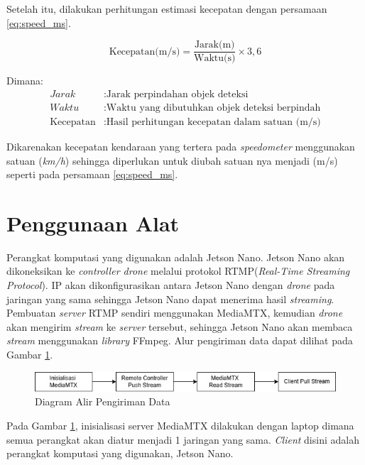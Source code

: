 Setelah itu, dilakukan perhitungan estimasi kecepatan dengan persamaan \ref{eq:speed_ms}.

\begin{equation}
  \label{eq:speed_ms}
  \text{Kecepatan(m/s)} = \frac{\text{Jarak(m)}}{\text{Waktu(s)}} \times 3{,}6
\end{equation}

\begin{flushleft}
Dimana:
\begin{align*}
Jarak & : \text{Jarak perpindahan objek deteksi} \\
Waktu & : \text{Waktu yang dibutuhkan objek deteksi berpindah} \\
\text{Kecepatan} & : \text{Hasil perhitungan kecepatan dalam satuan (m/s)}
\end{align*}
\end{flushleft}

Dikarenakan kecepatan kendaraan yang tertera pada \emph{speedometer} menggunakan satuan (\emph{km/h}) sehingga diperlukan untuk diubah satuan nya menjadi (m/s) seperti pada persamaan \ref{eq:speed_ms}.

\section{Penggunaan Alat}
Perangkat komputasi yang digunakan adalah Jetson Nano. Jetson Nano akan dikoneksikan ke \emph{controller drone} melalui protokol RTMP(\emph{Real-Time Streaming Protocol}). IP akan dikonfigurasikan antara Jetson Nano dengan \emph{drone} pada jaringan yang sama sehingga Jetson Nano dapat menerima hasil \emph{streaming}. Pembuatan \emph{server} RTMP sendiri menggunakan MediaMTX, kemudian \emph{drone} akan mengirim \emph{stream} ke \emph{server} tersebut, sehingga Jetson Nano akan membaca \emph{stream} menggunakan \emph{library} FFmpeg. Alur pengiriman data dapat dilihat pada Gambar \ref{fig:alurdata}.

\begin{figure} [H] \centering
  \includegraphics[scale=0.7]{bab3/pengirimandata.jpg}
  \caption{Diagram Alir Pengiriman Data}
  \label{fig:alurdata}
\end{figure}

Pada Gambar \ref{fig:alurdata}, inisialisasi server MediaMTX dilakukan dengan laptop dimana semua perangkat akan diatur menjadi 1 jaringan yang sama. \emph{Client} disini adalah perangkat komputasi yang digunakan, Jetson Nano.

